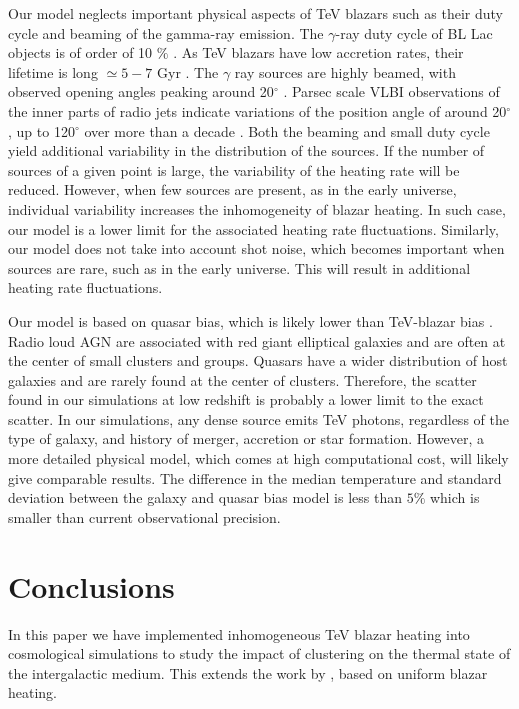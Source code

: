 \documentclass[twocolumns]{emulateapj}
\begin{document}
Our model neglects important physical aspects of TeV blazars such as their duty cycle and  beaming of the gamma-ray emission. The  $\gamma$-ray duty cycle of BL Lac objects is of order of 10 $\%$ \citep{1996ApJ...464..600S}.  As TeV blazars have low accretion rates, their lifetime is long $\simeq 5-7$ Gyr \citep{2002ApJ...571..226C}.  The $\gamma$ ray sources are highly beamed, with observed opening angles peaking around 20$^{\circ}$ \citep{2009A&A...507L..33P}.  Parsec scale VLBI observations of the inner parts of radio jets indicate variations of the position angle of around 20$^{\circ}$, up to 120$^{\circ}$ over more than a decade \citep{2013AJ....146..120L}.   Both the beaming and small duty cycle yield  additional variability in the distribution of the sources.   If the number  of sources of a given point is large, the variability of the heating rate  will be  reduced. However, when few sources are present, as in the early universe, individual variability increases the inhomogeneity of blazar heating. In such case, our model is a lower limit for the associated heating rate fluctuations. Similarly, our model does not take into account shot noise, which becomes important when sources are rare, such as in the early universe. This will result in additional heating rate fluctuations.

Our model is based on quasar bias, which is likely lower than TeV-blazar bias \citep{2014arXiv1410.0358A}. Radio loud AGN are associated with red giant elliptical galaxies \citep{2007A&A...476..723H} and are often at the center of small clusters and groups. Quasars have a wider distribution of host galaxies and are rarely found at the center of clusters. Therefore, the scatter found in our simulations at low redshift is probably a lower limit to the exact scatter. In our simulations, any dense source emits TeV photons, regardless of the type of galaxy, and history of merger, accretion  or star formation.  However, a more detailed physical model, which comes at high computational cost, will likely give comparable results. The difference in the median temperature and standard deviation between the galaxy and quasar bias model  is less than $5\%$ which is smaller than current observational precision. 

\section{Conclusions}
In this paper we  have implemented inhomogeneous TeV blazar heating into cosmological simulations to study the impact of clustering on the thermal state of the intergalactic medium. This extends the work by  \citet{2012ApJ...752...23C,2012MNRAS.423..149P}, based on uniform blazar heating.
\end{document}

